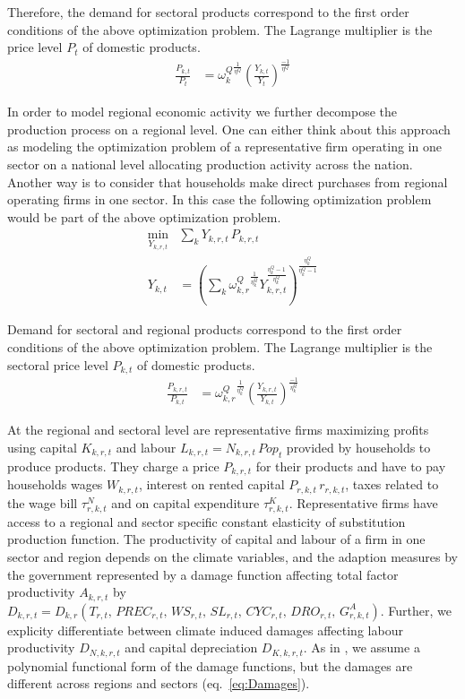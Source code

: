 \documentclass[10pt,a4paper]{article}
\begin{document}
Therefore, the demand for sectoral products correspond to the first order conditions of the above optimization problem. The Lagrange multiplier is the price level $P_{t}$ of domestic products. 
\begin{align}
\frac{P_{k,t}}{P_{t}} &= {\omega^{Q}_{k}}^{\frac{1}{\eta^Q}} \left(\frac{Y_{k,t}}{Y_{t}}\right)^{\frac{-1}{\eta^Q}}
\end{align}

In order to model regional economic activity we further decompose the production process on a regional level. One can either think about this approach as modeling the optimization problem of a representative firm operating in one sector on a national level allocating production activity across the nation. Another way is to consider that households make direct purchases from regional operating firms in one sector. In this case the following optimization problem would be part of the above optimization problem. 
\begin{align}
\underset{Y_{k,r,t}}{\mathrm{min}} & \sum_{k} Y_{k,r,t} \, P_{k,r,t} \\ 
Y_{k,t} &= \left(\sum_{k} {\omega^{Q}_{k,r}}^{\frac{1}{\eta^Q_{k}}} Y_{k,r,t}^{\frac{\eta^Q_{k}-1}{\eta^Q_{k}}} \right)^{\frac{\eta^Q_{k}}{\eta^Q_{k}-1}}
\end{align}

Demand for sectoral and regional products correspond to the first order conditions of the above optimization problem. The Lagrange multiplier is the sectoral price level $P_{k,t}$ of domestic products. 
\begin{align}
\frac{P_{k,r,t}}{P_{k,t}} &= {\omega^{Q}_{k,r}}^{\frac{1}{\eta^{Q}_{k}}} \left(\frac{Y_{k,r,t}}{Y_{k,t}}\right)^{\frac{-1}{\eta^{Q}_{k}}}
\end{align}

At the regional and sectoral level are representative firms maximizing profits using capital $K_{k,r,t}$ and labour $L_{k,r,t} = N_{k,r,t} \, Pop_{t}$ provided by households to produce products. They charge a price $P_{k,r,t}$ for their products and have to pay households wages $W_{k,r,t}$, interest on rented capital $P_{r,k,t} \, r_{r,k,t}$, taxes related to the wage bill $\tau^{N}_{r,k,t}$ and on capital expenditure $\tau^{K}_{r,k,t}$.  Representative firms have access to a regional and sector specific constant elasticity of substitution production function. The productivity of capital and labour of a firm in one sector and region depends on the climate variables, and the adaption measures by the government represented by a damage function affecting total factor productivity $A_{k,r,t}$ by $D_{k,r,t} = D_{k,r}\left(T_{r,t}, \, PREC_{r,t}, \, WS_{r,t}, \, SL_{r,t}, \, CYC_{r,t}, \, DRO_{r,t}, \, G^{A}_{r,k,t} \right)$.  Further, we explicity differentiate between climate induced damages affecting labour productivity $D_{N,k,r,t}$ and capital depreciation $D_{K,k,r,t}$. As in \cite{nordhaus1993optimal}, we assume a polynomial functional form of the damage functions, but the damages are different across regions and sectors (eq.~\ref{eq:Damages}).
\end{document}
